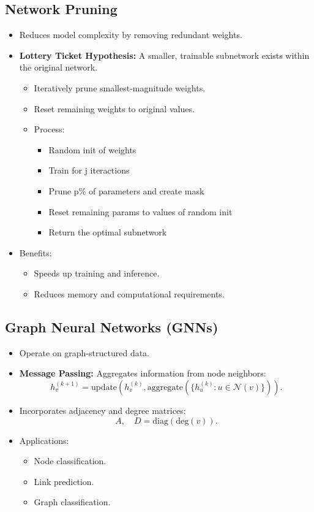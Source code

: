 \documentclass[12pt,a4paper]{article}
\begin{document}
\subsection{Network Pruning}
\begin{itemize}
    \item Reduces model complexity by removing redundant weights.
    \item \textbf{Lottery Ticket Hypothesis:} A smaller, trainable subnetwork exists within the original network.
    \begin{itemize}
        \item Iteratively prune smallest-magnitude weights.
        \item Reset remaining weights to original values.
        \item Process:
        \begin{itemize}
            \item Random init of weights
            \item Train for j iteractions
            \item Prune p\% of parameters and create mask 
            \item Reset remaining params to values of random init 
            \item Return the optimal subnetwork
        \end{itemize}
    \end{itemize}
    \item Benefits:
    \begin{itemize}
        \item Speeds up training and inference.
        \item Reduces memory and computational requirements.
    \end{itemize}
\end{itemize}
\subsection{Graph Neural Networks (GNNs)}
\begin{itemize}
    \item Operate on graph-structured data.
    \item \textbf{Message Passing:} Aggregates information from node neighbors:
    \[ h_v^{(k+1)} = \text{update}\left(h_v^{(k)}, \text{aggregate}(\{h_u^{(k)} : u \in \mathcal{N}(v)\})\right). \]
    \item Incorporates adjacency and degree matrices:
    \[ A, \quad D = \text{diag}(\text{deg}(v)). \]
    \item Applications:
    \begin{itemize}
        \item Node classification.
        \item Link prediction.
        \item Graph classification.
    \end{itemize}
\end{itemize}
\end{document}
